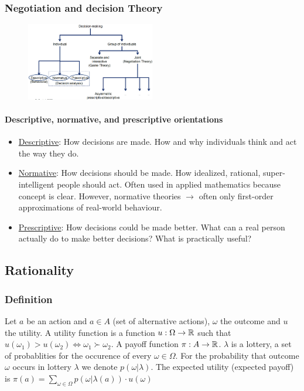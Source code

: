 \subsubsection{Negotiation and decision Theory}

\begin{figure}[H]
    \centering
    \includegraphics[width=0.5\textwidth]{Pictures/Negotiation_and_decision_theory.png}
    \label{Negotiation_and_decision_theory}
\end{figure}

\paragraph{Descriptive, normative, and prescriptive orientations}
\begin{itemize}
    \item \underline{Descriptive}: How decisions are made. How and why individuals
        think and act the way they do.
    \item \underline{Normative}: How decisions should be made. How idealized, rational,
        super-intelligent people should act. Often used in applied mathematics
        because concept is clear. However, normative theories $\rightarrow$ often
        only first-order approximations of real-world behaviour.
    \item \underline{Prescriptive}: How decisions could be made better. What can a
        real person actually do to make better decisions? What is practically useful?
\end{itemize}

\subsection{Rationality}

\subsubsection{Definition}

\begin{definition}[Rationality]
    Let $a$ be an action and $a \in A$ (set of alternative actions), $\omega$
    the outcome and $u$ the utility. A utility function is a function
    $u: \Omega \rightarrow \mathbb{R}$ such that $u(\omega_1) > u(\omega_2) \Leftrightarrow
    \omega_1 \succ \omega_2$. A payoff function $\pi: A \rightarrow \mathbb{R}$. $\lambda$
    is a lottery, a set of probablities for the occurence of every $\omega \in \Omega$.
    For the probability that outcome $\omega$ occurs in lottery $\lambda$ we denote
    $p(\omega | \lambda)$. The expected utility (expected payoff) is
    $\pi(a) = \sum_{\omega \in \Omega} p(\omega | \lambda(a)) \cdot u(\omega)$
\end{definition}

